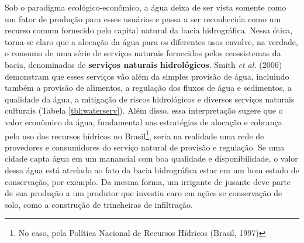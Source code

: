 \documentclass[./main.tex]{subfiles}
\begin{document}
\par Sob o paradigma ecológico-econômico, a água deixa de ser vista somente como um fator de produção para esses usuários e passa a ser reconhecida como um recurso comum fornecido pelo capital natural da bacia hidrográfica. Nessa ótica, torna-se claro que a alocação da água para os diferentes usos envolve, na verdade, o consumo de uma série de serviços naturais fornecidos pelos ecossistemas da bacia, denominados de \textbf{serviços naturais hidrológicos}. Smith \textit{et al.} (2006) \cite{Smith2006a} demonstram que esses serviços vão além da simples provisão de água, incluindo também a provisão de alimentos, a regulação dos fluxos de água e sedimentos, a qualidade da água, a mitigação de riscos hidrológicos e diversos serviços naturais culturais (Tabela \ref{tbl:waterserv}). Além disso, essa interpretação sugere que o valor econômico da água, fundamental nas estratégias de alocação e cobrança pelo uso dos recursos hídricos no Brasil\footnote{No caso, pela Política Nacional de Recursos Hídricos (Brasil, 1997)}, seria na realidade uma rede de provedores e consumidores do serviço natural de provisão e regulação. Se uma cidade capta água em um manancial com boa qualidade e disponibilidade, o valor dessa água está atrelado ao fato da bacia hidrográfica estar em um bom estado de conservação, por exemplo. Da mesma forma, um irrigante de jusante deve parte de sua produção a um produtor que investiu caro em ações se conservação de solo, como a construção de trincheiras de infiltração.
\end{document}
